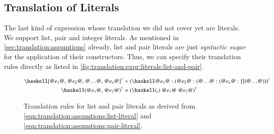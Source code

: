 \subsection{Translation of Literals} \label{sec:translation:expr:literals}
The last kind of expression whose translation we did not cover yet are literals.
We support list, pair and integer literals.
As mentioned in \autoref{sec:translation:assumtions} already, list and pair literals are just \textit{syntactic sugar} for the application of their constructors.
Thus, we can specify their translation rules directly as listed in \autoref{fig:translation:expr:literals:list-and-pair}.

\begin{figure}[H]
  \begin{align*}
    \toCoq{\haskellM{[@$e_1$@, @$e_2$@, @$\ldots$@, @$e_n$@]}}
    &= \toCoq{(\haskellM{@$e_1$@ : (@$e_2$@ : (@$\ldots$@ : (@$e_n$@ : [])@$\ldots$@))})}
    \\
    \toCoq{\haskellM{(@$e_1$@, @$e_2$@)}}
    &= \toCoq{(\haskellM{(,) @$e_1$@ @$e_2$@})}
  \end{align*}
  \caption{Translation rules for list and pair literals as derived from \autoref{eqn:translation:assumtions:list-literal} and \autoref{eqn:translation:assumtions:pair-literal}.}
  \label{fig:translation:expr:literals:list-and-pair}
\end{figure}

